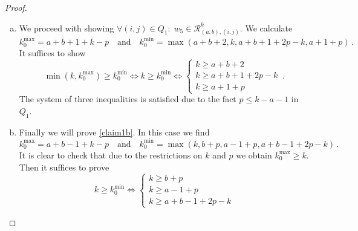 \documentclass[a4paper,11pt]{article}
\theoremstyle{plain}
\theoremstyle{definition}
\newcommand{\kmin}{k_0^{\text{min}}}
\newcommand{\kmax}{k_0^{\text{max}}}
\begin{document}
\begin{description}[wide, labelwidth=!, labelindent=0pt]
\begin{proof}
\begin{enumerate}[(a)]
    \begin{equation}
        \kmax=a+b+k-p \quad\text{and} \quad \kmin=\operatorname{max}(k,a+b+2p-k,b+1+p,a-1+p)\,.
    \end{equation}
    Since $\kmax \geq k$ it suffices to show:
    \begin{equation}
        k\geq \kmin \Longleftrightarrow \left\{\begin{array}{lr}
        k \geq a+b+2p-k \\
        k\geq b+1+p \\
        k\geq a-1+p 
        \end{array}\right. \,.
    \end{equation}
    The system of three inequalities above is satisfied due to $p\leq k-a-1$ in $Q_1$.
     \item \label{proof1c} We proceed with showing $\forall (i,j)\in Q_1:\; w_5 \in  \mathcal{R}^k_{(a,b),(i,j)}$. We calculate
    \begin{equation}
        \kmax=a+b+1+k-p \quad\text{and}\quad \kmin =\operatorname{max}(a+b+2,k,a+b+1+2p-k,a+1+p)\,.
    \end{equation}
    It suffices to show
    \begin{equation}
        \operatorname{min}(k,\kmax)\geq \kmin \Longleftrightarrow k\geq \kmin \Longleftrightarrow \left\{\begin{array}{lr}
        k \geq a+b+2 \\
        k\geq a+b+1+2p-k \\
        k\geq a+1+p 
        \end{array}\right. \,.
    \end{equation}
The system of   three inequalities is satisfied due to the fact $p\leq k-a-1$ in $Q_1$.
\item \label{proof1d} Finally we will prove \eqref{claim1b}. In this case we find
        \begin{equation}
            \kmax=a+b-1+k-p \quad\text{and}\quad \kmin=\operatorname{max}(k,b+p,a-1+p,a+b-1+2p-k)\,.
        \end{equation}
        It is clear to check that due to the restrictions on $k$ and $p$  we obtain $\kmax\geq k$. Then it suffices to prove 
        \begin{equation}
            k\geq \kmin \Longleftrightarrow  \left\{\begin{array}{lr}
        k \geq b+p \\
        k\geq a-1+p\\
        k\geq a+b-1+2p-k

\end{array}
\end{equation}
\end{enumerate}
\end{proof}
\end{description}
\end{document}
